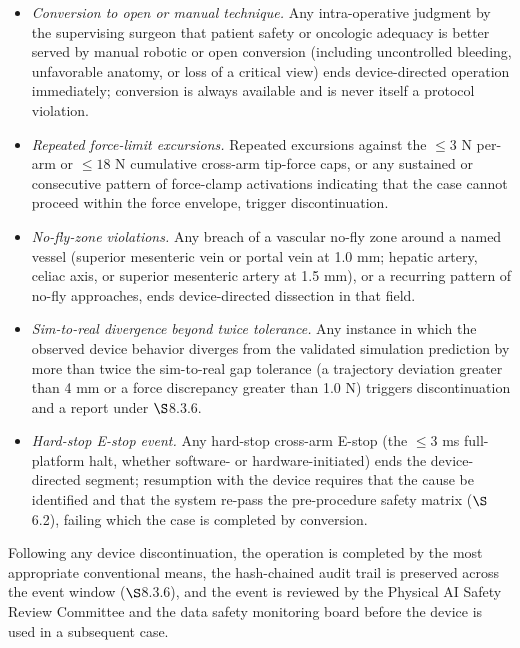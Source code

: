\begin{itemize}[leftmargin=1.4em,itemsep=1pt,topsep=2pt]
\item \textit{Conversion to open or manual technique.} Any intra-operative judgment
by the supervising surgeon that patient safety or oncologic adequacy is better
served by manual robotic or open conversion (including uncontrolled bleeding,
unfavorable anatomy, or loss of a critical view) ends device-directed operation
immediately; conversion is always available and is never itself a protocol
violation.
\item \textit{Repeated force-limit excursions.} Repeated excursions against the
$\leq 3$ N per-arm or $\leq 18$ N cumulative cross-arm tip-force caps, or any
sustained or consecutive pattern of force-clamp activations indicating that the
case cannot proceed within the force envelope, trigger discontinuation.
\item \textit{No-fly-zone violations.} Any breach of a vascular no-fly zone around a
named vessel (superior mesenteric vein or portal vein at 1.0 mm; hepatic artery,
celiac axis, or superior mesenteric artery at 1.5 mm), or a recurring pattern of
no-fly approaches, ends device-directed dissection in that field.
\item \textit{Sim-to-real divergence beyond twice tolerance.} Any instance in which
the observed device behavior diverges from the validated simulation prediction by
more than twice the sim-to-real gap tolerance (a trajectory deviation greater than
4 mm or a force discrepancy greater than 1.0 N) triggers discontinuation and a
report under $\S$8.3.6.
\item \textit{Hard-stop E-stop event.} Any hard-stop cross-arm E-stop (the
$\leq 3$ ms full-platform halt, whether software- or hardware-initiated) ends the
device-directed segment; resumption with the device requires that the cause be
identified and that the system re-pass the pre-procedure safety matrix
($\S$6.2), failing which the case is completed by conversion.
\end{itemize}

Following any device discontinuation, the operation is completed by the most
appropriate conventional means, the hash-chained audit trail is preserved across
the event window ($\S$8.3.6), and the event is reviewed by the Physical AI Safety
Review Committee and the data safety monitoring board before the device is used in
a subsequent case.

